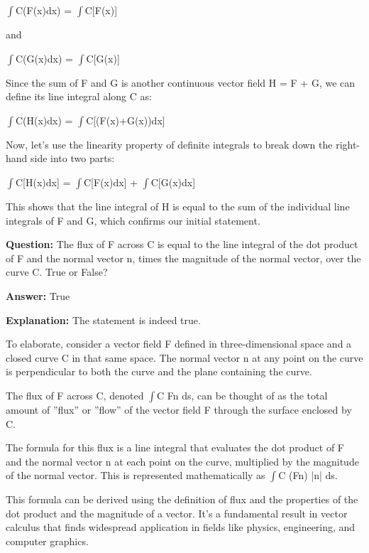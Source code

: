 \documentclass{article}
\begin{document}
\ensuremath{\int}C(F(x){\textperiodcentered}dx) = \ensuremath{\int}C[F(x)]

and

\ensuremath{\int}C(G(x){\textperiodcentered}dx) = \ensuremath{\int}C[G(x)]

Since the sum of F and G is another continuous vector field H = F + G, we can define its line integral along C as:

\ensuremath{\int}C(H(x){\textperiodcentered}dx) = \ensuremath{\int}C[(F(x)+G(x)){\textperiodcentered}dx]

Now, let's use the linearity property of definite integrals to break down the right-hand side into two parts:

\ensuremath{\int}C[H(x){\textperiodcentered}dx] = \ensuremath{\int}C[F(x){\textperiodcentered}dx] + \ensuremath{\int}C[G(x){\textperiodcentered}dx]

This shows that the line integral of H is equal to the sum of the individual line integrals of F and G, which confirms our initial statement.
                
                \vspace{0.5cm} 
        
            
                \textbf {Question:} The flux of F across C is equal to the line integral of the dot product of F and the normal vector n, times the magnitude of the normal vector, over the curve C. True or False?
                
                \textbf{Answer:} True

                \textbf{Explanation:} The statement is indeed true.

To elaborate, consider a vector field F defined in three-dimensional space and a closed curve C in that same space. The normal vector n at any point on the curve is perpendicular to both the curve and the plane containing the curve.

The flux of F across C, denoted \ensuremath{\int}C F{\textperiodcentered}n ds, can be thought of as the total amount of ''flux'' or ''flow'' of the vector field F through the surface enclosed by C. 

The formula for this flux is a line integral that evaluates the dot product of F and the normal vector n at each point on the curve, multiplied by the magnitude of the normal vector. This is represented mathematically as \ensuremath{\int}C (F{\textperiodcentered}n) |n| ds.

This formula can be derived using the definition of flux and the properties of the dot product and the magnitude of a vector. It's a fundamental result in vector calculus that finds widespread application in fields like physics, engineering, and computer graphics.
                
\end{document}
